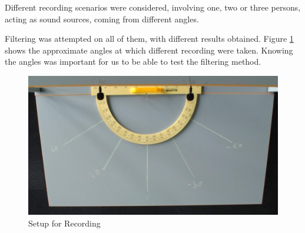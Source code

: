 Different recording scenarios were considered, involving one, two or three persons, acting as sound sources,
coming from different angles.

Filtering was attempted on all of them, with different results obtained.
\newpage
Figure \ref{fig:recSetup} shows the approximate angles at which different recording were taken. Knowing the 
angles was important for us to be able to test the filtering method.
\begin{figure}[htp]
	\centering
	\includegraphics[width=1\textwidth]{Illustrations/JustSetup.jpg}
	\caption{Setup for Recording}
	\label{fig:recSetup}
\end{figure}



 

